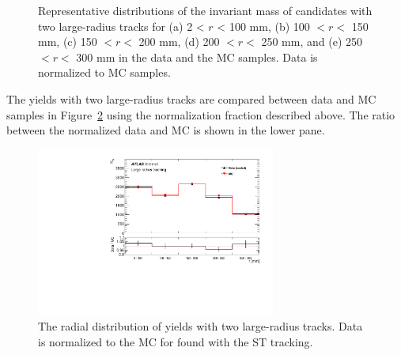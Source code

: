\begin{figure}[!htb]
    \caption{Representative distributions of the invariant mass of \Ks candidates with two large-radius tracks for (a) 2 < $r$ < 100 mm, (b) 100 $<r<$ 150 mm, (c) 150 $<r<$ 200 mm, (d) 200 $<r<$ 250 mm, and (e) 250 $<r<$ 300 mm in the data and the MC samples. Data is normalized to MC samples.}
    \label{fig:Ks_mass}
\end{figure}

The \Ks yields with two large-radius tracks are compared between data and MC samples in Figure~\ref{fig:Ks_double_ratio} using the normalization fraction described above. The ratio between the normalized data and MC is shown in the lower pane.

\begin{figure}[!htb]
	\includegraphics[width=0.70\textwidth]{figures/m_syst_Ks_ratio_LRT_R.pdf}
	\centering
	\caption{The radial distribution of \Ks yields with two large-radius tracks. Data is normalized to the MC for \Ks found with the ST tracking.} %
	\label{fig:Ks_double_ratio}
\end{figure}

